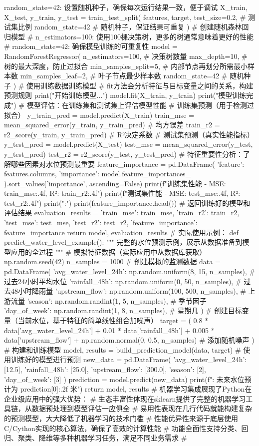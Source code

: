 {{{{{{random_state=42: 设置随机种子，确保每次运行结果一致，便于调试 X_train, X_test, y_train, y_test = train_test_split( features, target, test_size=0.2, # 测试集比例 random_state=42 # 随机种子，保证结果可重复 ) # 创建随机森林回归模型 # n_estimators=100: 使用100棵决策树，更多的树通常意味着更好的性能 # random_state=42: 确保模型训练的可重复性 model = RandomForestRegressor( n_estimators=100, # 决策树数量 max_depth=10, # 树的最大深度，防止过拟合 min_samples_split=5, # 内部节点再划分所需最小样本数 min_samples_leaf=2, # 叶子节点最少样本数 random_state=42 # 随机种子 ) # 使用训练数据训练模型 # fit方法会分析特征与目标变量之间的关系，构建预测规则 print("开始训练模型...") model.fit(X_train, y_train) print("模型训练完成") # 模型评估：在训练集和测试集上评估模型性能 # 训练集预测（用于检测过拟合） y_train_pred = model.predict(X_train) train_mse = mean_squared_error(y_train, y_train_pred) # 均方误差 train_r2 = r2_score(y_train, y_train_pred) # R²决定系数 # 测试集预测（真实性能指标） y_test_pred = model.predict(X_test) test_mse = mean_squared_error(y_test, y_test_pred) test_r2 = r2_score(y_test, y_test_pred) # 特征重要性分析：了解哪些因素对水位预测最重要 feature_importance = pd.DataFrame({ 'feature': features.columns, 'importance': model.feature_importances_ }).sort_values('importance', ascending=False) print(f"训练集性能 - MSE: {train_mse:.4f}, R²: {train_r2:.4f}") print(f"测试集性能 - MSE: {test_mse:.4f}, R²: {test_r2:.4f}") print(":") print(feature_importance.head()) # 返回训练好的模型和评估结果 evaluation_results = { 'train_mse': train_mse, 'train_r2': train_r2, 'test_mse': test_mse, 'test_r2': test_r2, 'feature_importance': feature_importance } return model, evaluation_results # 实际使用示例： def predict_water_level_example(): """ 完整的水位预测示例，展示从数据准备到模型应用的全过程 """ # 模拟特征数据（实际应用中从数据库获取） np.random.seed(42) n_samples = 1000 # 创建模拟的监测数据 data = pd.DataFrame({ 'avg_water_level_24h': np.random.uniform(8, 15, n_samples), # 过去24小时平均水位 'rainfall_48h': np.random.uniform(0, 50, n_samples), # 过去48小时降雨量 'upstream_flow': np.random.uniform(100, 500, n_samples), # 上游流量 'season': np.random.randint(1, 5, n_samples), # 季节因子 'day_of_week': np.random.randint(1, 8, n_samples), # 星期几 }) # 创建目标变量（当前水位，基于特征的简单线性组合加噪声） target = ( 0.8 * data['avg_water_level_24h'] + 0.01 * data['rainfall_48h'] + 0.005 * data['upstream_flow'] + np.random.normal(0, 0.5, n_samples) # 添加随机噪声 ) # 构建和训练模型 model, results = build_prediction_model(data, target) # 使用训练好的模型进行预测 new_data = pd.DataFrame({ 'avg_water_level_24h': [12.5], 'rainfall_48h': [25.0], 'upstream_flow': [300.0], 'season': [2], 'day_of_week': [3] }) prediction = model.predict(new_data) print(f": 未来水位预计为 {prediction[0]:.2f} 米") return model, results # 机器学习集成展现了Python在企业级应用中的强大优势： # 生态丰富性体现在sklearn提供了完整的机器学习工具链，从数据预处理到模型评估一应俱全 # 易用性表现在几行代码就能构建复杂的预测模型，大大降低了机器学习的技术门槛 # 性能优异性来源于底层使用C/Cython实现的核心算法，确保了高效的计算性能 # 功能全面性支持分类、回归、聚类、降维等多种机器学习任务，满足不同业务需求 # }}}}}}
